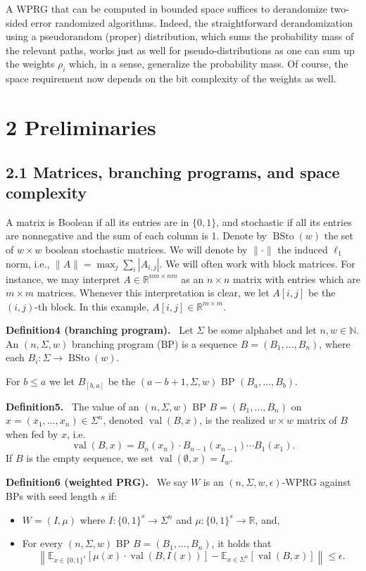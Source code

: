 \documentclass[10pt,a4paper]{article}
\newenvironment{authorclaim}[1]{\par\medskip\noindent\textbf{#1.}\ }{\par\medskip}
\begin{document}
A WPRG that can be computed in bounded space suffices to derandomize two-sided error randomized algorithms. Indeed, the straightforward derandomization using a pseudorandom (proper) distribution, which sums the probability mass of the relevant paths, works just as well for pseudo-distributions as one can sum up the weights $\rho_i$ which, in a sense, generalize the probability mass. Of course, the space requirement now depends on the bit complexity of the weights as well.
\section*{2 Preliminaries}
\subsection*{2.1 Matrices, branching programs, and space complexity}
A matrix is Boolean if all its entries are in $\{0,1\}$, and stochastic if all its entries are nonnegative and the sum of each column is 1. Denote by $\operatorname{BSto}(w)$ the set of $w\times w$ boolean stochastic matrices. We will denote by $\|\cdot\|$ the induced $\ell_1$ norm, i.e., $\|A\|=\max_j\sum_i|A_{i,j}|$.
We will often work with block matrices. For instance, we may interpret $A\in\mathbb R^{nm\times nm}$ as an $n\times n$ matrix with entries which are $m\times m$ matrices. Whenever this interpretation is clear, we let $A[i,j]$ be the $(i,j)$-th block. In this example, $A[i,j]\in\mathbb R^{m\times m}$.
\begin{authorclaim}{Definition4 (branching program)}
Let $\Sigma$ be some alphabet and let $n,w\in\mathbb N$. An $(n,\Sigma,w)$ branching program (BP) is a sequence $B=(B_1,\ldots,B_n)$, where each $B_i:\Sigma\to\operatorname{BSto}(w)$.
\end{authorclaim}
For $b\le a$ we let $B_{[b,a]}$ be the $(a-b+1,\Sigma,w)$ BP $(B_a,\ldots,B_b)$.
\begin{authorclaim}{Definition5}
The value of an $(n,\Sigma,w)$ BP $B=(B_1,\ldots,B_n)$ on $x=(x_1,\ldots,x_n)\in\Sigma^n$, denoted $\operatorname{val}(B,x)$, is the realized $w\times w$ matrix of $B$ when fed by $x$, i.e.
\[\operatorname{val}(B,x)=B_n(x_n)\cdot B_{n-1}(x_{n-1})\cdots B_1(x_1).\]
If $B$ is the empty sequence, we set $\operatorname{val}(\emptyset,x)=I_w$.
\end{authorclaim}
\begin{authorclaim}{Definition6 (weighted PRG)}
We say $W$ is an $(n,\Sigma,w,\epsilon)$-WPRG against BPs with seed length $s$ if:
\begin{itemize}
\item $W=(I,\mu)$ where $I:\{0,1\}^s\to\Sigma^n$ and $\mu:\{0,1\}^s\to\mathbb R$, and,
\item For every $(n,\Sigma,w)$ BP $B=(B_1,\ldots,B_n)$, it holds that
\[\left\|\mathbb E_{x\in\{0,1\}^s}[\mu(x)\cdot\operatorname{val}(B,I(x))]-\mathbb E_{x\in\Sigma^n}[\operatorname{val}(B,x)]\right\|\le\epsilon.\]
\end{itemize}
\end{authorclaim}
\end{document}
